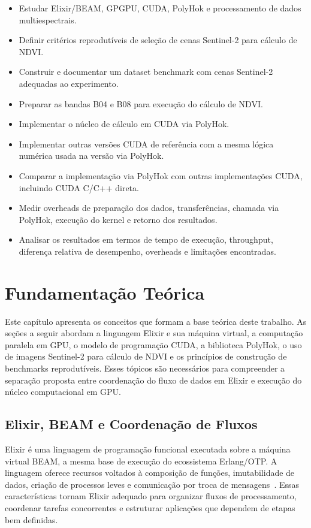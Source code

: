 \documentclass[tcc,capa]{texufpel}
\begin{document}
\begin{itemize}
  \item Estudar Elixir/BEAM, GPGPU, CUDA, PolyHok e processamento de dados multiespectrais.
  \item Definir critérios reprodutíveis de seleção de cenas Sentinel-2 para cálculo de NDVI.
  \item Construir e documentar um dataset benchmark com cenas Sentinel-2 adequadas ao experimento.
  \item Preparar as bandas B04 e B08 para execução do cálculo de NDVI.
  \item Implementar o núcleo de cálculo em CUDA via PolyHok.
  \item Implementar outras versões CUDA de referência com a mesma lógica numérica usada na versão via PolyHok.
  \item Comparar a implementação via PolyHok com outras implementações CUDA, incluindo CUDA C/C++ direta.
  \item Medir overheads de preparação dos dados, transferências, chamada via PolyHok, execução do kernel e retorno dos resultados.
  \item Analisar os resultados em termos de tempo de execução, throughput, diferença relativa de desempenho, overheads e limitações encontradas.
\end{itemize}

\chapter{Fundamentação Teórica}

Este capítulo apresenta os conceitos que formam a base teórica deste trabalho. As
seções a seguir abordam a linguagem Elixir e sua máquina virtual, a computação
paralela em GPU, o modelo de programação CUDA, a biblioteca PolyHok, o uso de
imagens Sentinel-2 para cálculo de NDVI e os princípios de construção de benchmarks
reprodutíveis. Esses tópicos são necessários para compreender a separação proposta
entre coordenação do fluxo de dados em Elixir e execução do núcleo computacional
em GPU.

\section{Elixir, BEAM e Coordenação de Fluxos}

Elixir é uma linguagem de programação funcional executada sobre a máquina virtual
BEAM, a mesma base de execução do ecossistema Erlang/OTP. A linguagem oferece
recursos voltados à composição de funções, imutabilidade de dados, criação de
processos leves e comunicação por troca de mensagens~\cite{elixirDocs2026,
erlangOtpDocs2026}. Essas características tornam Elixir adequado para organizar
fluxos de processamento, coordenar tarefas concorrentes e estruturar aplicações que
dependem de etapas bem definidas.
\end{document}
